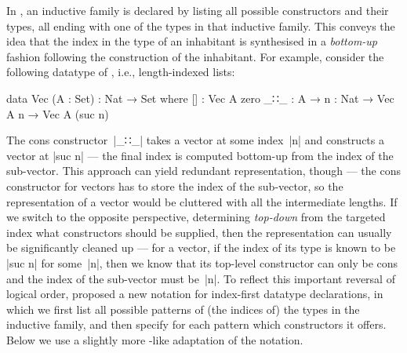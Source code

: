 In \Agda, an inductive family is declared by listing all possible constructors and their types, all ending with one of the types in that inductive family.
This conveys the idea that the index in the type of an inhabitant is synthesised in a \emph{bottom-up} fashion following the construction of the inhabitant.
For example, consider the following datatype of , i.e., length-indexed lists:
\begin{code}
data Vec (A : Set) : Nat → Set where
  []   : Vec A zero
  _∷_  : A → {n : Nat} → Vec A n → Vec A (suc n)
\end{code}
The cons constructor~|_∷_| takes a vector at some index~|n| and constructs a vector at |suc n| --- the final index is computed bottom-up from the index of the sub-vector.
This approach can yield redundant representation, though --- the cons constructor for vectors has to store the index of the sub-vector, so the representation of a vector would be cluttered with all the intermediate lengths.
If we switch to the opposite perspective, determining \emph{top-down} from the targeted index what constructors should be supplied, then the representation can usually be significantly cleaned up --- for a vector, if the index of its type is known to be |suc n| for some~|n|, then we know that its top-level constructor can only be cons and the index of the sub-vector must be~|n|.
To reflect this important reversal of logical order, \citet{Dagand-functional-ornaments} proposed a new notation for index-first datatype declarations, in which we first list all possible patterns of (the indices of) the types in the inductive family, and then specify for each pattern which constructors it offers.
Below we use a slightly more \Agda-like adaptation of the notation.

